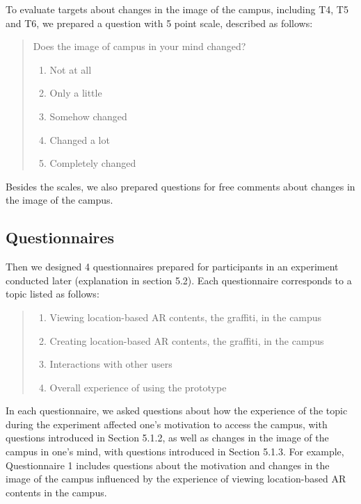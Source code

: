 To evaluate targets about changes in the image of the campus, including T4, T5 and T6,
we prepared a question with 5 point scale, described as follows:

\begin{quote}
  Does the image of campus in your mind changed?
  \begin{enumerate}
    \item Not at all
    \item Only a little
    \item Somehow changed
    \item Changed a lot
    \item Completely changed
  \end{enumerate}
\end{quote}

Besides the scales, we also prepared questions for free comments about changes in the image of the campus.

\subsection{Questionnaires}

Then we designed 4 questionnaires prepared for participants in an experiment conducted later (explanation in section 5.2). Each questionnaire corresponds to a topic listed as follows:

\begin{quote}
  \begin{enumerate}
    \item Viewing location-based AR contents, the graffiti, in the campus
    \item Creating location-based AR contents, the graffiti, in the campus
    \item Interactions with other users
    \item Overall experience of using the prototype
  \end{enumerate}
\end{quote}

In each questionnaire, we asked questions about how the experience of the topic during the experiment affected one's motivation to access the campus, with questions introduced in Section 5.1.2, as well as changes in the image of the campus in one's mind, with questions introduced in Section 5.1.3.
For example, Questionnaire 1 includes questions about the motivation and changes in the image of the campus influenced by the experience of viewing location-based AR contents in the campus.

